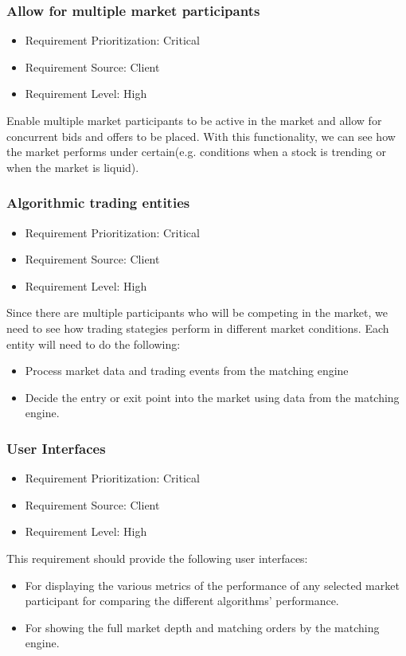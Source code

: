 \documentclass[12pt]{article}
\begin{document}
				\subsubsection{Allow for multiple market participants}
				\begin{itemize}
					\item Requirement Prioritization: Critical
					\item Requirement Source: Client
					\item Requirement Level: High 	
				\end{itemize}
				Enable multiple market participants to be active in the market and allow for concurrent bids and offers to be placed. With this functionality, we can see how the market performs under certain(e.g. conditions when a stock is trending or when the market is liquid). 
				
				\subsubsection{Algorithmic trading entities}
				\begin{itemize}
					\item Requirement Prioritization: Critical
					\item Requirement Source: Client 	
					\item Requirement Level: High
				\end{itemize}
				Since there are multiple participants who will be competing in the market, we need to see how trading stategies perform in different market conditions. Each entity will need to do the following:
					\begin{itemize}
						\item Process market data and trading events from the matching engine
						\item Decide the entry or exit point into the market using data from the matching engine.
					\end{itemize}
			\pagebreak	
				\subsubsection{User Interfaces}
				\begin{itemize}
					\item Requirement Prioritization: Critical
					\item Requirement Source: Client 
					\item Requirement Level: High	
				\end{itemize}
				This requirement should provide the following user interfaces:
					\begin{itemize}
						\item  For displaying the various metrics of the performance of any selected market participant for comparing the different algorithms' performance.
						\item For showing the full market depth and matching orders by the matching engine.
					\end{itemize}
\end{document}
